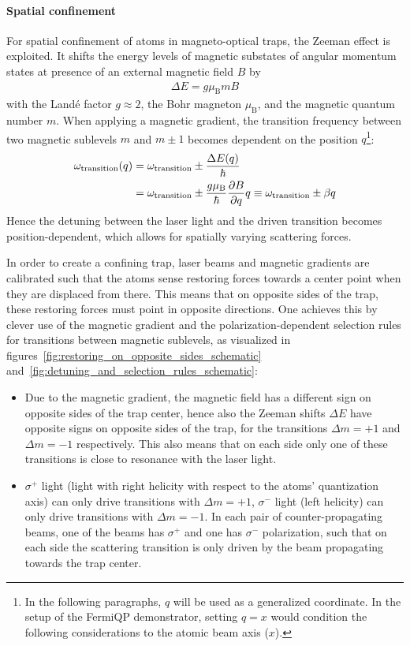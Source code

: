 \paragraph{Spatial confinement} For spatial confinement of atoms in magneto-optical traps, the Zeeman effect is exploited. It shifts the energy levels of magnetic substates of angular momentum states at presence of an external magnetic field $B$ by
\begin{align}
    \Delta E = g \mu_\text{B} m B
\end{align}
with the Landé factor $g \approx 2$, the Bohr magneton $\mu_\text{B}$, and the magnetic quantum number $m$. When applying a magnetic gradient, the transition frequency between two magnetic sublevels $m$ and $m \pm 1$ becomes dependent on the position $q$\footnote{In the following paragraphs, $q$ will be used as a generalized coordinate. In the setup of the FermiQP demonstrator, setting $q = x$ would condition the following considerations to the atomic beam axis ($x$).}:
\begin{equation}
    \begin{split}\label{eq:omega_transition_zeeman}
      \omega_\text{transition}(q) &= \omega_\text{transition} \pm \frac{\Delta E(q)}{\hbar} \\  
      &= \omega_\text{transition} \pm \frac{g \mu_\text{B}}{\hbar} \pdv{B}{q} q \equiv \omega_\text{transition} \pm \beta q
    \end{split}
\end{equation}
Hence the detuning between the laser light and the driven transition becomes position-dependent, which allows for spatially varying scattering forces.

In order to create a confining trap, laser beams and magnetic gradients are calibrated such that the atoms sense restoring forces towards a center point when they are displaced from there. This means that on opposite sides of the trap, these restoring forces must point in opposite directions. One achieves this by clever use of the magnetic gradient and the polarization-dependent selection rules for transitions between magnetic sublevels, as visualized in figures~\ref{fig:restoring_on_opposite_sides_schematic} and~\ref{fig:detuning_and_selection_rules_schematic}:
\begin{itemize}
    \item Due to the magnetic gradient, the magnetic field has a different sign on opposite sides of the trap center, hence also the Zeeman shifts $\Delta E$ have opposite signs on opposite sides of the trap, for the transitions $\Delta m = +1$ and $\Delta m = -1$ respectively. This also means that on each side only one of these transitions is close to resonance with the laser light.
    \item $\sigma^+$ light (light with right helicity with respect to the atoms' quantization axis) can only drive transitions with $\Delta m = +1$, $\sigma^-$ light (left helicity) can only drive transitions with $\Delta m = -1$. In each pair of counter-propagating beams, one of the beams has $\sigma^+$ and one has $\sigma^-$ polarization, such that on each side the scattering transition is only driven by the beam propagating towards the trap center.
\end{itemize}

